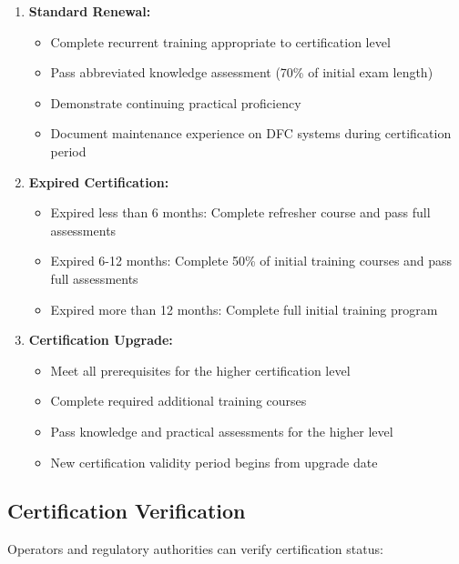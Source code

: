 \documentclass[12pt,a4paper,twoside,openright]{book}
\begin{document}
\begin{enumerate}
    \item \textbf{Standard Renewal:}
    \begin{itemize}
        \item Complete recurrent training appropriate to certification level
        \item Pass abbreviated knowledge assessment (70\% of initial exam length)
        \item Demonstrate continuing practical proficiency
        \item Document maintenance experience on DFC systems during certification period
    \end{itemize}
    
    \item \textbf{Expired Certification:}
    \begin{itemize}
        \item Expired less than 6 months: Complete refresher course and pass full assessments
        \item Expired 6-12 months: Complete 50\% of initial training courses and pass full assessments
        \item Expired more than 12 months: Complete full initial training program
    \end{itemize}
    
    \item \textbf{Certification Upgrade:}
    \begin{itemize}
        \item Meet all prerequisites for the higher certification level
        \item Complete required additional training courses
        \item Pass knowledge and practical assessments for the higher level
        \item New certification validity period begins from upgrade date
    \end{itemize}
\end{enumerate}

\subsection{Certification Verification}

Operators and regulatory authorities can verify certification status:
\end{document}

